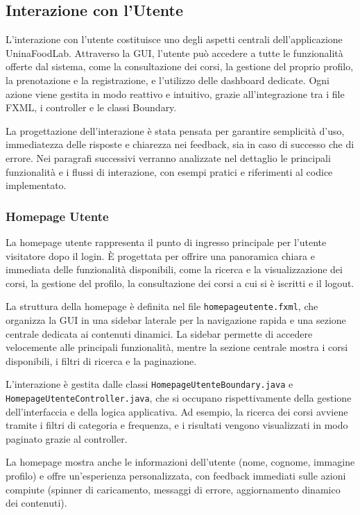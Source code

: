 \subsection{Interazione con l'Utente}

L'interazione con l'utente costituisce uno degli aspetti centrali dell'applicazione UninaFoodLab. Attraverso la GUI, l'utente può accedere a tutte le funzionalità offerte dal sistema, come la consultazione dei corsi, la gestione del proprio profilo, la prenotazione e la registrazione, e l'utilizzo delle dashboard dedicate. Ogni azione viene gestita in modo reattivo e intuitivo, grazie all'integrazione tra i file FXML, i controller e le classi Boundary.

La progettazione dell'interazione è stata pensata per garantire semplicità d'uso, immediatezza delle risposte e chiarezza nei feedback, sia in caso di successo che di errore. Nei paragrafi successivi verranno analizzate nel dettaglio le principali funzionalità e i flussi di interazione, con esempi pratici e riferimenti al codice implementato.

\subsubsection{Homepage Utente}

La homepage utente rappresenta il punto di ingresso principale per l’utente visitatore dopo il login. È progettata per offrire una panoramica chiara e immediata delle funzionalità disponibili, come la ricerca e la visualizzazione dei corsi, la gestione del profilo, la consultazione dei corsi a cui si è iscritti e il logout.

La struttura della homepage è definita nel file \texttt{homepageutente.fxml}, che organizza la GUI in una sidebar laterale per la navigazione rapida e una sezione centrale dedicata ai contenuti dinamici. La sidebar permette di accedere velocemente alle principali funzionalità, mentre la sezione centrale mostra i corsi disponibili, i filtri di ricerca e la paginazione.

L’interazione è gestita dalle classi \texttt{HomepageUtenteBoundary.java} e \texttt{HomepageUtenteController.java}, che si occupano rispettivamente della gestione dell’interfaccia e della logica applicativa. Ad esempio, la ricerca dei corsi avviene tramite i filtri di categoria e frequenza, e i risultati vengono visualizzati in modo paginato grazie al controller.

La homepage mostra anche le informazioni dell’utente (nome, cognome, immagine profilo) e offre un’esperienza personalizzata, con feedback immediati sulle azioni compiute (spinner di caricamento, messaggi di errore, aggiornamento dinamico dei contenuti).


